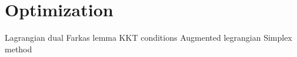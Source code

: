 \documentclass[12pt,oneside]{book}
\begin{document}
\pagestyle{empty}
\begin{multicols}{2}
  \tableofcontents
\end{multicols}
\part{Optimization}






Lagrangian dual
Farkas lemma
KKT conditions
Augmented legrangian
Simplex method
\end{document}
